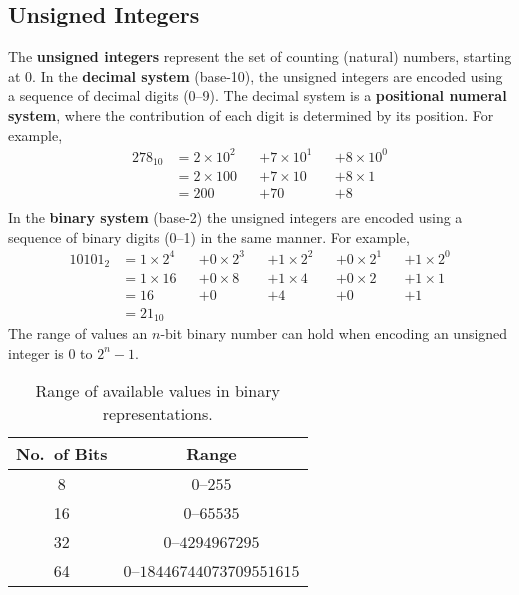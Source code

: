 \documentclass{article}
\begin{document}
\subsection{Unsigned Integers}
The \textbf{unsigned integers} represent the set of counting (natural)
numbers, starting at 0. In the \textbf{decimal system} (base-10), the
unsigned integers are encoded using a sequence of decimal digits
(0--9). The decimal system is a \textbf{positional numeral system},
where the contribution of each digit is determined by its position. For
example,
\begin{align*}
    278_{10} & = 2 \times 10^2 &  & + 7 \times 10^1 &  & + 8 \times 10^0 \\
             & = 2 \times 100  &  & + 7 \times 10   &  & + 8 \times 1    \\
             & = 200           &  & + 70            &  & + 8             \\
\end{align*}
In the \textbf{binary system} (base-2) the unsigned integers are encoded using a sequence of binary digits (0--1)
in the same manner. For example,
\begin{align*}
    10101_2 & = 1 \times 2^4 &  & + 0 \times 2^3 &  & + 1 \times 2^2 &  & + 0 \times 2^1 &  & + 1 \times 2^0 \\
            & = 1 \times 16  &  & + 0 \times 8   &  & + 1 \times 4   &  & + 0 \times 2   &  & + 1 \times 1   \\
            & = 16           &  & + 0            &  & + 4            &  & + 0            &  & + 1            \\
            & = 21_{10}
\end{align*}
The range of values an \(n\)-bit binary number can hold when encoding an unsigned integer is 0 to \(2^n - 1\).
\begin{table}[H]
    \centering
    \begin{tabular}{c c}
        \toprule
        \textbf{No.\ of Bits} & \textbf{Range}                        \\
        \midrule
        8                     & \(0\)--\(255\)                        \\
        16                    & \(0\)--\(\num{65535}\)                \\
        32                    & \(0\)--\(\num{4294967295}\)           \\
        64                    & \(0\)--\(\num{18446744073709551615}\) \\
        \bottomrule
    \end{tabular}
    \caption{Range of available values in binary representations.} %
\end{table}
\end{document}
